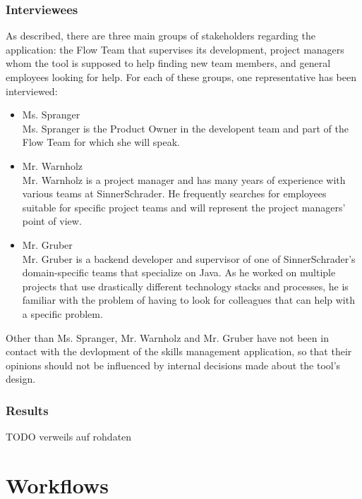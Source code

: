 \subsubsection{Interviewees}
As described, there are three main groups of stakeholders regarding the application: the Flow Team that supervises its development, project managers whom the tool is supposed to help finding new team members, and general employees looking for help. For each of these groups, one representative has been interviewed:
\begin{itemize}
	\item Ms. Spranger\\
	Ms. Spranger is the Product Owner in the developent team and part of the Flow Team for which she will speak.
	\item Mr. Warnholz\\
	Mr. Warnholz is a project manager and has many years of experience with various teams at SinnerSchrader. He frequently searches for
	employees suitable for specific project teams and will represent the project managers' point of view.
	\item Mr. Gruber\\
	Mr. Gruber is a backend developer and supervisor of one of SinnerSchrader's domain-specific teams that specialize on Java. As he worked on multiple projects that
	use drastically different technology stacks and processes, he is familiar with the problem of having to look for colleagues that can help with a specific problem.
\end{itemize}
Other than Ms. Spranger, Mr. Warnholz and Mr. Gruber have not been in contact with the devlopment of the skills management application, so that their opinions should not be influenced by internal decisions made about the tool's design.

\subsubsection{Results}
TODO verweils auf rohdaten



\section{Workflows}

